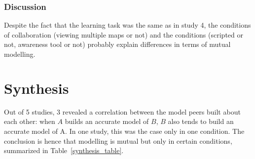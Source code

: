 \documentclass[natbib]{svjour3}
\begin{document}
\subsubsection*{Discussion}

Despite the fact that the learning task was the same as in study 4, the
conditions of collaboration (viewing multiple maps or not) and the conditions
(scripted or not, awareness tool or not) probably explain differences in terms
of mutual modelling.

\section{Synthesis}

Out of 5 studies, 3 revealed a correlation between the model peers built about
each other: when $A$ builds an accurate model of $B$, $B$ also tends to build an
accurate model of A.  In one study, this was the case only in one condition.
The conclusion is hence that modelling is mutual but only in certain conditions,
summarized in Table~\ref{synthesis_table}.
\end{document}
